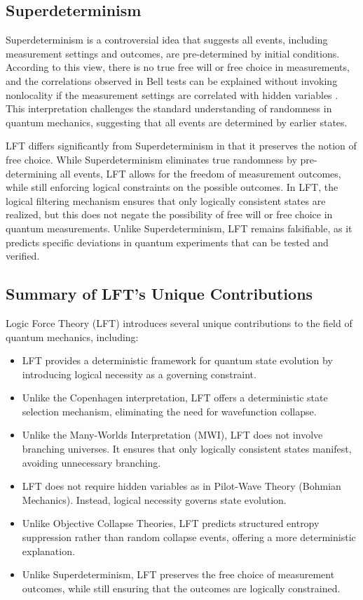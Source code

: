 \subsection{Superdeterminism}
Superdeterminism is a controversial idea that suggests all events, including measurement settings and outcomes, are pre-determined by initial conditions. According to this view, there is no true free will or free choice in measurements, and the correlations observed in Bell tests can be explained without invoking nonlocality if the measurement settings are correlated with hidden variables \cite{fine1982}. This interpretation challenges the standard understanding of randomness in quantum mechanics, suggesting that all events are determined by earlier states.

LFT differs significantly from Superdeterminism in that it preserves the notion of free choice. While Superdeterminism eliminates true randomness by pre-determining all events, LFT allows for the freedom of measurement outcomes, while still enforcing logical constraints on the possible outcomes. In LFT, the logical filtering mechanism ensures that only logically consistent states are realized, but this does not negate the possibility of free will or free choice in quantum measurements. Unlike Superdeterminism, LFT remains falsifiable, as it predicts specific deviations in quantum experiments that can be tested and verified.

\subsection{Summary of LFT’s Unique Contributions}
Logic Force Theory (LFT) introduces several unique contributions to the field of quantum mechanics, including:
\begin{itemize}
    \item LFT provides a deterministic framework for quantum state evolution by introducing logical necessity as a governing constraint.
    \item Unlike the Copenhagen interpretation, LFT offers a deterministic state selection mechanism, eliminating the need for wavefunction collapse.
    \item Unlike the Many-Worlds Interpretation (MWI), LFT does not involve branching universes. It ensures that only logically consistent states manifest, avoiding unnecessary branching.
    \item LFT does not require hidden variables as in Pilot-Wave Theory (Bohmian Mechanics). Instead, logical necessity governs state evolution.
    \item Unlike Objective Collapse Theories, LFT predicts structured entropy suppression rather than random collapse events, offering a more deterministic explanation.
    \item Unlike Superdeterminism, LFT preserves the free choice of measurement outcomes, while still ensuring that the outcomes are logically constrained.
\end{itemize}